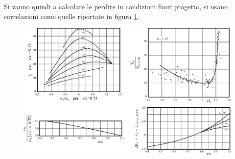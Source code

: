 Si vanno quindi a calcolare le perdite in condizioni fuori progetto, si usano correlazioni come quelle riportate in figura \ref{fig:FuoriProgT1}.
\begin{figure}
\centering
  \includegraphics[width=\textwidth]{fig/FuoriProgT1.pdf}
\caption{}
\label{fig:FuoriProgT1}
\end{figure}

